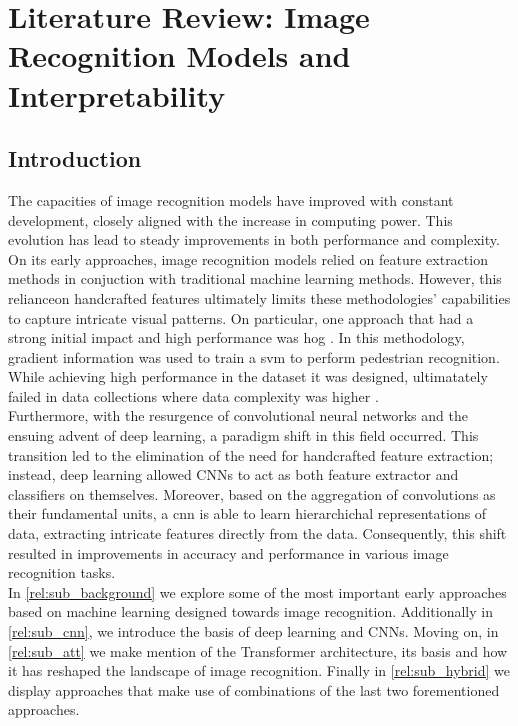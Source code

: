 \chapter{Literature Review: Image Recognition Models and Interpretability}
\label{ch:rel}
\chaptertoc{}
\section{Introduction}
The capacities of image recognition models have improved with constant development, 
closely aligned with the increase in computing power. This evolution has lead to steady 
improvements in both performance and complexity. On its early approaches, image recognition models 
relied on feature extraction methods  in conjuction with traditional machine learning methods.
However, this relianceon handcrafted features ultimately limits these methodologies' capabilities 
to capture intricate visual patterns.
On particular, one approach that had a strong initial impact and high performance was \gls{hog} 
\autocite{dalal2005histograms}. In this methodology, gradient information was used to train a 
\gls{svm} to perform pedestrian recognition. While achieving high performance in the dataset it was 
designed, ultimatately 
failed in data collections where data complexity was higher \autocite{5975165}.\\
Furthermore, with the resurgence of convolutional neural networks and the ensuing advent of 
deep learning, a paradigm shift in this field occurred. This transition led to the elimination of 
the need for handcrafted feature extraction; instead, deep learning allowed CNNs to act 
as both feature extractor and classifiers on themselves. Moreover, based on the aggregation of 
convolutions as their fundamental units, a \gls{cnn} is able to learn hierarchichal 
representations of data, extracting intricate features directly from the data. 
Consequently, this shift resulted in improvements in accuracy and performance in various image 
recognition tasks. \\

\noindent In \autoref{rel:sub_background} we explore some of the most important early approaches based 
on machine learning designed towards image recognition. Additionally in \autoref{rel:sub_cnn}, we 
introduce the basis of deep learning and CNNs. Moving on, in \autoref{rel:sub_att} we make mention 
of the Transformer architecture, its basis and how it has reshaped the landscape of image 
recognition. Finally in \autoref{rel:sub_hybrid} we display approaches that make use of combinations 
of the last two forementioned approaches.\\


